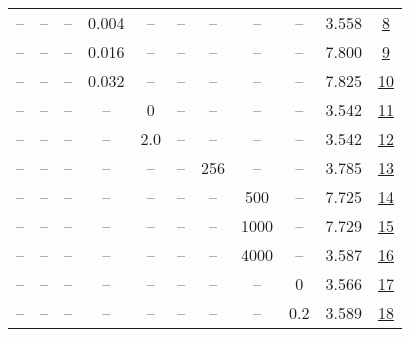 \begin{table}[H]
\begin{tabular}{ccccccccccc}
-- & -- & -- & 0.004 & -- & -- & -- & -- & -- & 3.558 & \href{https://wandb.ai/stanford-mercury/optimizer-scaling/runs/sweep-130m-2B-mini08c39flr0.004-wd0.1-minlr0-warmup2000-b10.9-b2-1b064a}{8} \\
-- & -- & -- & 0.016 & -- & -- & -- & -- & -- & 7.800 & \href{https://wandb.ai/stanford-mercury/optimizer-scaling/runs/sweep-130m-2B-mini22b748lr0.016-wd0.1-minlr0-warmup2000-b10.9-b2-6d20c4}{9} \\
-- & -- & -- & 0.032 & -- & -- & -- & -- & -- & 7.825 & \href{https://wandb.ai/stanford-mercury/optimizer-scaling/runs/sweep-130m-2B-mini6489b1lr0.032-wd0.1-minlr0-warmup2000-b10.9-b2-fcd042}{10} \\
-- & -- & -- & -- & 0 & -- & -- & -- & -- & 3.542 & \href{https://wandb.ai/stanford-mercury/optimizer-scaling/runs/sweep-130m-2B-mini55874clr0.008-wd0.1-minlr0-warmup2000-b10.9-b2-324f5b}{11} \\
-- & -- & -- & -- & 2.0 & -- & -- & -- & -- & 3.542 & \href{https://wandb.ai/stanford-mercury/optimizer-scaling/runs/sweep-130m-2B-mini08c2adlr0.008-wd0.1-minlr0-warmup2000-b10.9-b2-4e9589}{12} \\
-- & -- & -- & -- & -- & -- & 256 & -- & -- & 3.785 & \href{https://wandb.ai/stanford-mercury/optimizer-scaling/runs/sweep-130m-2B-minidd6b61lr0.008-wd0.1-minlr0-warmup2000-b10.9-b2-b988c3}{13} \\
-- & -- & -- & -- & -- & -- & -- & 500 & -- & 7.725 & \href{https://wandb.ai/stanford-mercury/optimizer-scaling/runs/sweep-130m-2B-mini0c2c00lr0.008-wd0.1-minlr0-warmup500-b10.9-b20-8094ab}{14} \\
-- & -- & -- & -- & -- & -- & -- & 1000 & -- & 7.729 & \href{https://wandb.ai/stanford-mercury/optimizer-scaling/runs/sweep-130m-2B-minibd49d8lr0.008-wd0.1-minlr0-warmup1000-b10.9-b2-28a98b}{15} \\
-- & -- & -- & -- & -- & -- & -- & 4000 & -- & 3.587 & \href{https://wandb.ai/stanford-mercury/optimizer-scaling/runs/sweep-130m-2B-minif55f2dlr0.008-wd0.1-minlr0-warmup4000-b10.9-b2-b00ef5}{16} \\
-- & -- & -- & -- & -- & -- & -- & -- & 0 & 3.566 & \href{https://wandb.ai/stanford-mercury/optimizer-scaling/runs/sweep-130m-2B-mini73fab0lr0.008-wd0-minlr0-warmup2000-b10.9-b20.-aac58f}{17} \\
-- & -- & -- & -- & -- & -- & -- & -- & 0.2 & 3.589 & \href{https://wandb.ai/stanford-mercury/optimizer-scaling/runs/sweep-130m-2B-mini9fac99lr0.008-wd0.2-minlr0-warmup2000-b10.9-b2-86f1dc}{18} \\
\bottomrule
\end{tabular}
\end{table}


